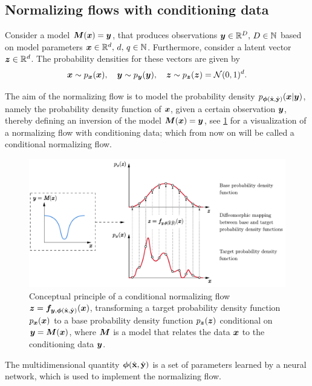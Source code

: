 \documentclass[a4paper,12pt]{report}
\begin{document}
\subsection{Normalizing flows with conditioning data}
Consider a model $\bm{M}(\bm{x}) = \bm{y}$, that produces observations $\bm{y} \in \mathbb{R}^D,\,D \in \mathbb{N}$ based on model parameters $\bm{x}\in\mathbb{R}^d,\,d,\,q \in \mathbb{N}$. Furthermore, consider a latent vector $\bm{z} \in \mathbb{R}^d$. The probability densities for these vectors are given by \begin{equation}
\bm{x} \sim p_{\bm{x}}(\bm{x}), \quad \bm{y} \sim p_{\bm{y}}(\bm{y}), \quad \bm{z}\sim p_{\bm{z}}(\bm{z}) = \mathcal{N}(0,1)^d.
\end{equation}

The aim of the normalizing flow is to model the probability density $p_{\bm{\phi}(\hat{\boldsymbol{\mathbf{x}}},\hat{\boldsymbol{\mathbf{y}}})}(\bm{x}|\bm{y})$, namely the probability density function of $\bm{x}$, given a certain observation $\bm{y}$, thereby defining an inversion of the model $\bm{M}(\bm{x}) = \bm{y}$, see \cref{fig:normflowconditional} for a visualization of a normalizing flow with conditioning data; which from now on will be called a conditional normalizing flow.
\begin{figure}[h]
\centering
\includegraphics[width=\textwidth]{figures/normflowconditional.pdf}
\caption{Conceptual principle of a conditional normalizing flow $\bm{z} = \bm{f}_{\bm{y},\bm{\phi}(\hat{\boldsymbol{\mathbf{x}}},\hat{\boldsymbol{\mathbf{y}}})}(\bm{x})$, transforming a target probability density function $p_{\bm{x}}(\bm{x})$ to a base probability density function $p_{\bm{z}}(\bm{z})$ conditional on $\bm{y} = \bm{M}(\bm{x})$, where $\bm{M}$ is a model that relates the data $\bm{x}$ to the conditioning data $\bm{y}$.}
\label{fig:normflowconditional}
\end{figure}
The multidimensional quantity $\bm{\phi}(\hat{\boldsymbol{\mathbf{x}}},\hat{\boldsymbol{\mathbf{y}}})$ is a set of parameters learned by a neural network, which is used to implement the normalizing flow.
\end{document}
